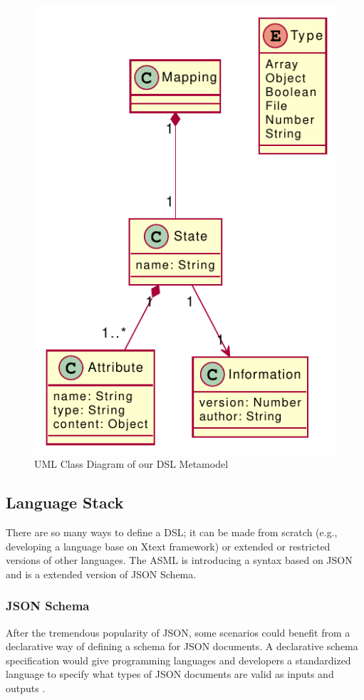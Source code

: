 \begin{figure}
    \includegraphics[scale=1]{../figures/asml-class-diagram}
    \centering
    \caption{UML Class Diagram of our DSL Metamodel}
    \label{fig:asml-meta-model}
\end{figure}

\subsection{Language Stack}
There are so many ways to define a DSL; it can be made from scratch (e.g., developing a language base on Xtext framework) or extended or restricted versions of other languages. The ASML is introducing a syntax based on JSON and is a extended version of JSON Schema. 


\subsubsection{JSON Schema}
After the tremendous popularity of JSON, some scenarios could benefit from a declarative way of defining a schema for JSON documents.
A declarative schema specification would give programming languages and developers a standardized language to specify what types of JSON documents are valid as inputs and outputs \cite{json-schema}.

